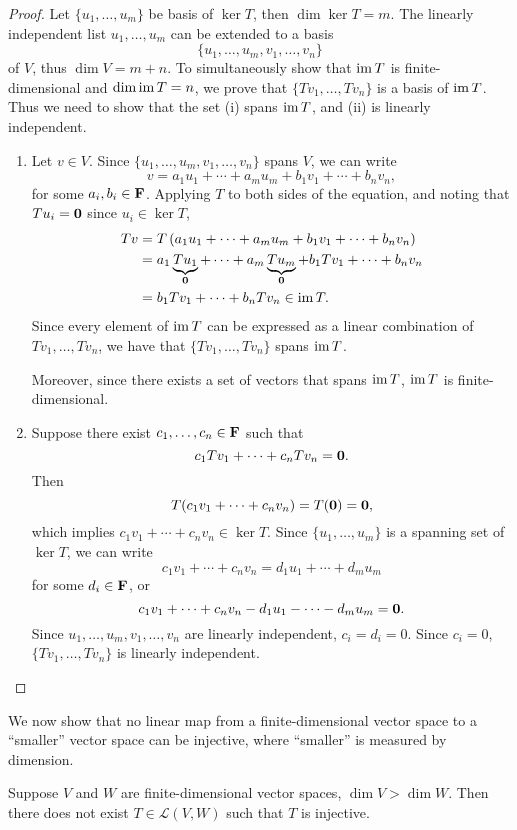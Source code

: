 \begin{proof}
Let $\{u_1,\dots,u_m\}$ be basis of $\ker T$, then $\dim\ker T=m$. The linearly independent list $u_1,\dots,u_m$ can be extended to a basis
\[\{u_1,\dots,u_m,v_1,\dots,v_n\}\]
of $V$, thus $\dim V=m+n$. To simultaneously show that $\operatorname{im} T$ is finite-dimensional and $\dim\operatorname{im} T=n$, we prove that $\{Tv_1,\dots,Tv_n\}$ is a basis of $\operatorname{im} T$. Thus we need to show that the set (i) spans $\operatorname{im} T$, and (ii) is linearly independent.

\begin{enumerate}[label=(\roman*)]
\item Let $v\in V$. Since $\{u_1,\dots,u_m,v_1,\dots,v_n\}$ spans $V$, we can write
\[v=a_1u_1+\cdots+a_mu_m+b_1v_1+\cdots+b_nv_n,\]
for some $a_i,b_i\in\mathbf F$. Applying $T$ to both sides of the equation, and noting that $Tu_i=\vb{0}$ since $u_i\in\ker T$,
\begin{align*}
Tv&=T\left(a_1u_1+\cdots+a_mu_m+b_1v_1+\cdots+b_nv_n\right)\\
&=a_1\underbrace{Tu_1}_{\vb{0}}+\cdots+a_m\underbrace{Tu_m}_{\vb{0}}+b_1Tv_1+\cdots+b_nv_n\\
&=b_1Tv_1+\cdots+b_nTv_n\in\operatorname{im} T.
\end{align*}
Since every element of $\operatorname{im} T$ can be expressed as a linear combination of $Tv_1,\dots,Tv_n$, we have that $\{Tv_1,\dots,Tv_n\}$ spans $\operatorname{im} T$.

Moreover, since there exists a set of vectors that spans $\operatorname{im} T$, $\operatorname{im} T$ is finite-dimensional.

\item Suppose there exist $c_1,\dots,c_n\in\mathbf F$ such that
\[c_1Tv_1+\cdots+c_nTv_n=\vb{0}.\]
Then
\[T(c_1v_1+\cdots+c_nv_n)=T(\vb{0})=\vb{0},\]
which implies $c_1v_1+\cdots+c_nv_n\in\ker T$. Since $\{u_1,\dots,u_m\}$ is a spanning set of $\ker T$, we can write
\[c_1v_1+\cdots+c_nv_n=d_1u_1+\cdots+d_mu_m\]
for some $d_i\in\mathbf F$, or
\[c_1v_1+\cdots+c_nv_n-d_1u_1-\cdots-d_mu_m=\vb{0}.\]
Since $u_1,\dots,u_m,v_1,\dots,v_n$ are linearly independent, $c_i=d_i=0$. Since $c_i=0$, $\{Tv_1,\dots,Tv_n\}$ is linearly independent.
\end{enumerate}
\end{proof}

We now show that no linear map from a finite-dimensional vector space to a ``smaller'' vector space can be injective, where ``smaller'' is measured by dimension.

\begin{proposition}
Suppose $V$ and $W$ are finite-dimensional vector spaces, $\dim V>\dim W$. Then there does not exist $T\in\mathcal{L}(V,W)$ such that $T$ is injective.
\end{proposition}

